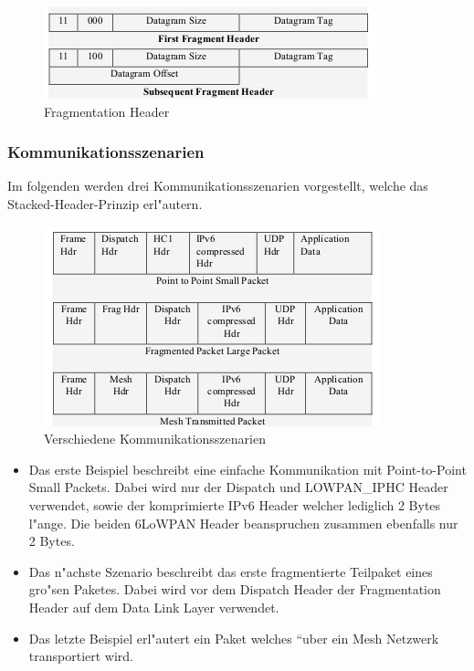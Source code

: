 \documentclass[final]{lktseminar}
\begin{document}
\begin{figure}[h]
    \centering
    \includegraphics{fragment_header.png}
    \caption{Fragmentation Header \cite{6lowpan_architecture}}
    \label{fig:Fragmentation Header}
\end{figure}


\subsubsection{Kommunikationsszenarien}
\label{sec: Kommunikationsszenarien}

Im folgenden werden drei Kommunikationsszenarien vorgestellt, welche das Stacked-Header-Prinzip erl"autern.
\begin{figure}[h]
    \centering
    \includegraphics{kommunikationsszenario.png}
    \caption{Verschiedene Kommunikationsszenarien \cite{6lowpan_demystified}}
    \label{fig:Kommunikationsszenarien}
\end{figure}

\begin{itemize}
    \item Das erste Beispiel beschreibt eine einfache Kommunikation mit Point-to-Point Small Packets. Dabei wird nur
    der Dispatch und LOWPAN\_IPHC Header verwendet, sowie der komprimierte IPv6 Header welcher lediglich 2 Bytes l"ange. Die beiden
    6LoWPAN Header beanspruchen zusammen ebenfalls nur 2 Bytes.
    \item Das n"achste Szenario beschreibt das erste fragmentierte Teilpaket eines gro"sen Paketes. Dabei wird vor dem Dispatch Header der
    Fragmentation Header auf dem Data Link Layer verwendet.
    \item Das letzte Beispiel erl"autert ein Paket welches ``uber ein Mesh Netzwerk transportiert wird.

\end{itemize}
\newpage
\end{document}
